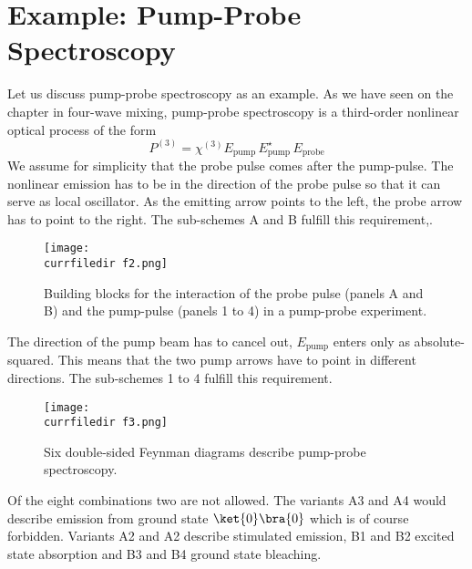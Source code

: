 \section{Example: Pump-Probe Spectroscopy}

Let us discuss pump-probe spectroscopy as an example. As we have seen on the chapter in four-wave mixing, pump-probe spectroscopy is a third-order nonlinear optical process of the form
\begin{equation}
 P^{(3)} =  \chi^{(3)} E_\text{pump} \, E_\text{pump}^\star \, E_\text{probe}
\end{equation}
We assume for simplicity that the probe pulse comes after the pump-pulse. The nonlinear emission has to be in the direction of the probe pulse so that it can serve as local oscillator. As the emitting arrow points to the left, the probe arrow has to point to the right. The sub-schemes A and B fulfill this requirement,.


\begin{figure}
\texttt{[image: \\currfiledir f2.png]}
\caption{
Building blocks for the interaction of the probe pulse (panels A and B) and the pump-pulse (panels 1 to 4) in a pump-probe experiment.}
\label{fig_2d_f2}
\end{figure}

The direction of the pump beam has to cancel out, $E_\text{pump} $ enters only as absolute-squared. This means that the two pump arrows have to point in different directions. The sub-schemes 1 to 4 fulfill this requirement.

\begin{figure}
\texttt{[image: \\currfiledir f3.png]}
\caption{
Six double-sided Feynman diagrams describe pump-probe spectroscopy.}
\label{fig_2d_f3}
\end{figure}

Of the eight combinations two are not allowed. The variants A3 and A4 would describe  emission from ground state  $\ket{0} \bra{0}$ which is of course forbidden. Variants A2 and A2 describe stimulated emission, B1 and B2 excited state absorption and B3 and B4 ground state bleaching.

